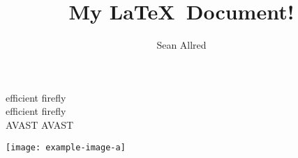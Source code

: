 \documentclass[twocolumn]{article}
\title{My \LaTeX\ Document!}
\author{Sean Allred}
\begin{document}
\maketitle
\blindmathtrue
efficient firefly \\
ef{}f{}icient f{}iref{}ly\\
AVAST A{}VAST

\lipsum
\texttt{[image: example-image-a]}
\end{document}
